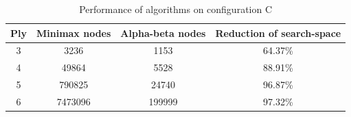 \documentclass{article}
\begin{document}
\begin{table}[ht]
		\centering
		 \begin{tabular}{cccc} 
		 \hline
		 Ply & Minimax nodes & Alpha-beta nodes & Reduction of search-space \\ [0.5ex] 
		 \hline\hline
		 3 & 3236 & 1153 & 64.37\% \\
		 \hline
		 4 & 49864 & 5528 & 88.91\% \\
		 \hline
		 5 & 790825 & 24740 & 96.87\% \\
		 \hline
		 6 & 7473096 & 199999 & 97.32\% \\
		 \hline
		\end{tabular}
		\label{table:performance_results}
		\caption{Performance of algorithms on configuration C}
		\end{table}
\end{document}

